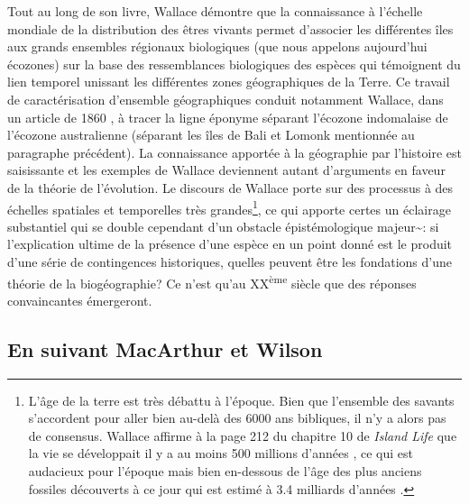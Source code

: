 Tout au long de son livre, Wallace démontre que la connaissance à
l'échelle mondiale de la distribution des êtres vivants permet
d'associer les différentes îles aux grands ensembles régionaux
biologiques (que nous appelons aujourd'hui écozones) sur la base des
ressemblances biologiques des espèces qui témoignent du lien temporel
unissant les différentes zones géographiques de la Terre. Ce travail de
caractérisation d'ensemble géographiques conduit notamment Wallace, dans
un article de 1860 \citep{Wallace1860}, à tracer la ligne éponyme
séparant l'écozone indomalaise de l'écozone australienne (séparant les
îles de Bali et Lomonk mentionnée au paragraphe précédent). La
connaissance apportée à la géographie par l'histoire est saisissante et
les exemples de Wallace deviennent autant d'arguments en faveur de la
théorie de l'évolution. Le discours de Wallace porte sur des processus à
des échelles spatiales et temporelles très grandes\footnote{L'âge de la
  terre est très débattu à l'époque. Bien que l'ensemble des savants
  s'accordent pour aller bien au-delà des 6000 ans bibliques, il n'y a
  alors pas de consensus. Wallace affirme à la page 212 du chapitre 10
  de \emph{Island Life} que la vie se développait il y a au moins 500
  millions d'années \citep{wallace1881island}, ce qui est audacieux pour
  l'époque mais bien en-dessous de l'âge des plus anciens fossiles
  découverts à ce jour qui est estimé à 3.4 milliards d'années
  \citep{Wacey2011}.}, ce qui apporte certes un éclairage substantiel
qui se double cependant d'un obstacle épistémologique
majeur\textasciitilde{}: si l'explication ultime de la présence d'une
espèce en un point donné est le produit d'une série de contingences
historiques, quelles peuvent être les fondations d'une théorie de la
biogéographie? Ce n'est qu'au XX\textsuperscript{ème} siècle que des
réponses convaincantes émergeront.

\subsection*{En suivant MacArthur et
Wilson}\label{en-suivant-macarthur-et-wilson}

